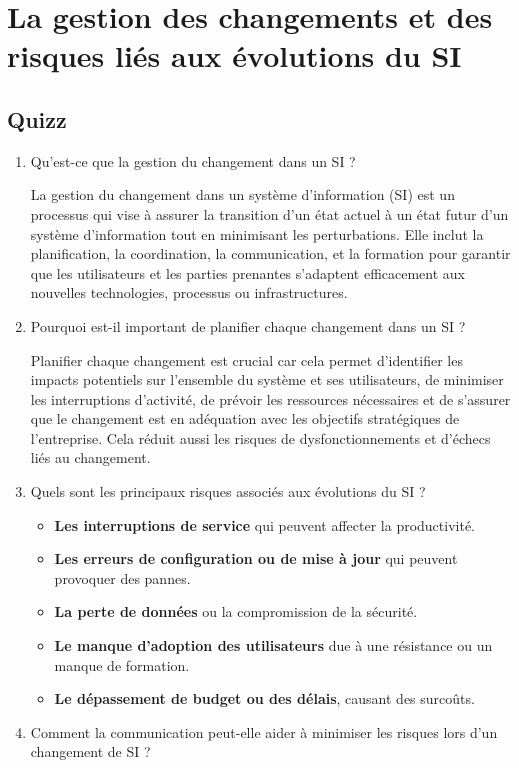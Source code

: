 \chapter{La gestion des changements et des risques liés aux évolutions du SI}

\section*{Quizz}

\begin{enumerate}
    \item Qu'est-ce que la gestion du changement dans un SI ?

        La gestion du changement dans un système d'information (SI) est un processus qui vise à assurer la transition d'un état actuel à un état futur d'un système d'information tout en minimisant les perturbations. Elle inclut la planification, la coordination, la communication, et la formation pour garantir que les utilisateurs et les parties prenantes s'adaptent efficacement aux nouvelles technologies, processus ou infrastructures.
    \item Pourquoi est-il important de planifier chaque changement dans un SI ?

        Planifier chaque changement est crucial car cela permet d'identifier les impacts potentiels sur l'ensemble du système et ses utilisateurs, de minimiser les interruptions d'activité, de prévoir les ressources nécessaires et de s'assurer que le changement est en adéquation avec les objectifs stratégiques de l'entreprise. Cela réduit aussi les risques de dysfonctionnements et d'échecs liés au changement.
    \item Quels sont les principaux risques associés aux évolutions du SI ?

        \begin{itemize}
            \item \textbf{Les interruptions de service} qui peuvent affecter la productivité.
            \item \textbf{Les erreurs de configuration ou de mise à jour} qui peuvent provoquer des pannes.
            \item \textbf{La perte de données} ou la compromission de la sécurité.
            \item \textbf{Le manque d'adoption des utilisateurs} due à une résistance ou un manque de formation.
            \item \textbf{Le dépassement de budget ou des délais}, causant des surcoûts.
        \end{itemize}
    \item Comment la communication peut-elle aider à minimiser les risques lors d’un changement de SI ?


\end{enumerate}
